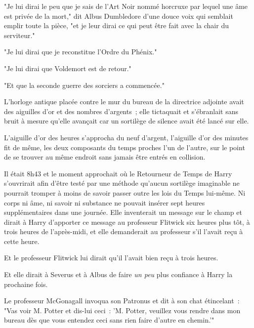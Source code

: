 "Je lui dirai le peu que je sais de l'Art Noir nommé horcruxe par lequel une âme est privée de la mort," dit Albus Dumbledore d'une douce voix qui semblait emplir toute la pièce, "et je leur dirai ce qui peut être fait avec la chair du serviteur."

"Je lui dirai que je reconstitue l'Ordre du Phénix."

"Je lui dirai que Voldemort est de retour."

"Et que la seconde guerre des sorciers a commencée."


L'horloge antique placée contre le mur du bureau de la directrice adjointe avait des aiguilles d'or et des nombres d'argents~; elle tictaquait et s'ébranlait sans bruit à mesure qu'elle avançait car un sortilège de silence avait été lancé sur elle.

L'aiguille d'or des heures s'approcha du neuf d'argent, l'aiguille d'or des minutes fit de même, les deux composants du temps proches l'un de l'autre, sur le point de se trouver au même endroit sans jamais être entrés en collision.

Il était 8h43 et le moment approchait où le Retourneur de Temps de Harry s'ouvrirait afin d'être testé par une méthode qu'aucun sortilège imaginable ne pourrait tromper à moins de savoir passer outre les lois du Temps lui-même. Ni corps ni âme, ni savoir ni substance ne pouvait insérer sept heures supplémentaires dans une journée. Elle inventerait un message sur le champ et dirait à Harry d'apporter ce message au professeur Flitwick six heures plus tôt, à trois heures de l'après-midi, et elle demanderait au professeur s'il l'avait reçu à cette heure.

Et le professeur Flitwick lui dirait qu'il l'avait bien reçu à trois heures.

Et elle dirait à Severus et à Albus de faire \emph{un peu} plus confiance à Harry la prochaine fois.

Le professeur McGonagall invoqua son Patronus et dit à son chat étincelant~: "Vas voir M. Potter et dis-lui ceci~: 'M. Potter, veuillez vous rendre dans mon bureau dès que vous entendez ceci sans rien faire d'autre en chemin.'" 


